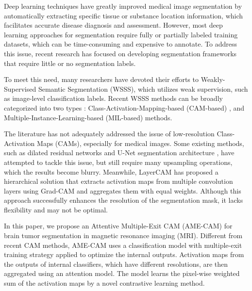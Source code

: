 

Deep learning techniques \cite{chen2020zero,wen2020noises,chen2021ct,chen2021one,chen2022representative} have greatly improved medical image segmentation by automatically extracting specific tissue or substance location information, which facilitates accurate disease diagnosis and assessment. However, most deep learning approaches for segmentation require fully or partially labeled training datasets, which can be time-consuming and expensive to annotate. To address this issue, recent research has focused on developing segmentation frameworks that require little or no segmentation labels.

To meet this need, many researchers have devoted their efforts to Weakly-Supervised Semantic Segmentation (WSSS)\cite{wolleb2022diffusion}, which utilizes weak supervision, such as image-level classification labels. Recent WSSS methods can be broadly categorized into two types \cite{chan2021comprehensive}: Class-Activation-Mapping-based (CAM-based) \cite{selvaraju2017grad,wang2020score,jiang2021layercam,wang2020self,lee2021lfi,xie2022c2am}, and Multiple-Instance-Learning-based (MIL-based) \cite{qian2022transformer} methods.

The literature has not adequately addressed the issue of low-resolution Class-Activation Maps (CAMs), especially for medical images. Some existing methods, such as dilated residual networks \cite{yu2017dilated} and U-Net segmentation architecture \cite{belharbi2022f,englebert2022poly,tagaris2019high}, have attempted to tackle this issue, but still require many upsampling operations, which the results become blurry. Meanwhile, LayerCAM \cite{jiang2021layercam} has proposed a hierarchical solution that extracts activation maps from multiple convolution layers using Grad-CAM\cite{selvaraju2017grad} and aggregates them with equal weights. Although this approach successfully enhances the resolution of the segmentation mask, it lacks flexibility and may not be optimal.

In this paper, we propose an Attentive Multiple-Exit CAM (AME-CAM) for brain tumor segmentation in magnetic resonance imaging (MRI). Different from recent CAM methods, AME-CAM uses a classification model with multiple-exit training strategy applied to optimize the internal outputs. Activation maps from the outputs of internal classifiers, which have different resolutions, are then aggregated using an attention model. The model learns the pixel-wise weighted sum of the activation maps by a novel contrastive learning method.

